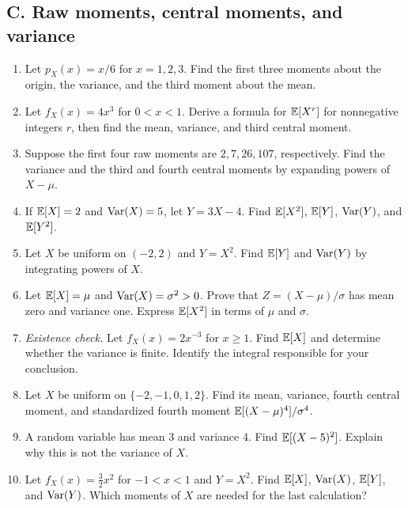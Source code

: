 \subsection{C. Raw moments, central moments, and variance}
\begin{enumerate}[label=\textbf{C\arabic*.},leftmargin=*,itemsep=0.75em]
\item Let $p_X(x)=x/6$ for $x=1,2,3$. Find the first three moments about the origin, the variance, and the third moment about the mean.
\item Let $f_X(x)=4x^3$ for $0<x<1$. Derive a formula for $\mathbb E[X^r]$ for nonnegative integers $r$, then find the mean, variance, and third central moment.
\item Suppose the first four raw moments are $2,7,26,107$, respectively. Find the variance and the third and fourth central moments by expanding powers of $X-\mu$.
\item If $\mathbb E[X]=2$ and $\operatorname{Var}(X)=5$, let $Y=3X-4$. Find $\mathbb E[X^2]$, $\mathbb E[Y]$, $\operatorname{Var}(Y)$, and $\mathbb E[Y^2]$.
\item Let $X$ be uniform on $(-2,2)$ and $Y=X^2$. Find $\mathbb E[Y]$ and $\operatorname{Var}(Y)$ by integrating powers of $X$.
\item Let $\mathbb E[X]=\mu$ and $\operatorname{Var}(X)=\sigma^2>0$. Prove that $Z=(X-\mu)/\sigma$ has mean zero and variance one. Express $\mathbb E[X^2]$ in terms of $\mu$ and $\sigma$.
\item \textit{Existence check.} Let $f_X(x)=2x^{-3}$ for $x\geq1$. Find $\mathbb E[X]$ and determine whether the variance is finite. Identify the integral responsible for your conclusion.
\item Let $X$ be uniform on $\{-2,-1,0,1,2\}$. Find its mean, variance, fourth central moment, and standardized fourth moment $\mathbb E[(X-\mu)^4]/\sigma^4$.
\item A random variable has mean $3$ and variance $4$. Find $\mathbb E[(X-5)^2]$. Explain why this is not the variance of $X$.
\item Let $f_X(x)=\tfrac32x^2$ for $-1<x<1$ and $Y=X^2$. Find $\mathbb E[X]$, $\operatorname{Var}(X)$, $\mathbb E[Y]$, and $\operatorname{Var}(Y)$. Which moments of $X$ are needed for the last calculation?
\end{enumerate}

